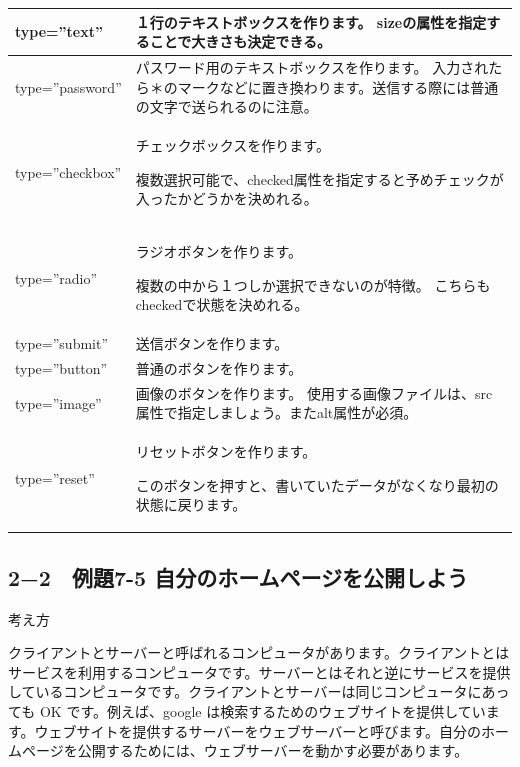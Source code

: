\documentclass[a4paper,12pt,dvipdfmx]{jarticle}
\begin{document}
\begin{flushleft}
\tablefirsthead{}
\tablehead{}
\tabletail{}
\tablelasttail{}
\begin{supertabular}{|m{3.4459999cm}|m{7.9160004cm}|}
\hline
type=”text” &
１行のテキストボックスを作ります。\newline
sizeの属性を指定することで大きさも決定できる。\\\hline
type=”password” &
パスワード用のテキストボックスを作ります。\newline
入力されたら＊のマークなどに置き換わります。送信する際には普通の文字で送られるのに注意。\\\hline
type=”checkbox” &
チェックボックスを作ります。

複数選択可能で、checked属性を指定すると予めチェックが入ったかどうかを決めれる。\\\hline
type=”radio” &
ラジオボタンを作ります。

複数の中から１つしか選択できないのが特徴。\newline
こちらもcheckedで状態を決めれる。\\\hline
type=”submit” &
送信ボタンを作ります。\\\hline
type=”button” &
普通のボタンを作ります。\\\hline
type=”image” &
画像のボタンを作ります。\newline
使用する画像ファイルは、src属性で指定しましょう。またalt属性が必須。\\\hline
type=”reset” &
リセットボタンを作ります。

このボタンを押すと、書いていたデータがなくなり最初の状態に戻ります。\\\hline
\end{supertabular}
\end{flushleft}

\bigskip

\clearpage\subsection*{2−2　例題7-5
自分のホームページを公開しよう}
考え方

クライアントとサーバーと呼ばれるコンピュータがあります。クライアントとはサービスを利用するコンピュータです。サーバーとはそれと逆にサービスを提供しているコンピュータです。クライアントとサーバーは同じコンピュータにあっても
OK です。例えば、google
は検索するためのウェブサイトを提供しています。ウェブサイトを提供するサーバーをウェブサーバーと呼びます。自分のホームページを公開するためには、ウェブサーバーを動かす必要があります。
\end{document}
